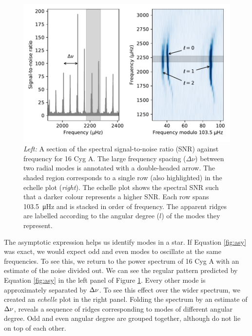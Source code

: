 \begin{figure}[tb]
    \centering
    \includegraphics{figures/seismo-echelle.pdf}
    \caption{\emph{Left:} A section of the spectral signal-to-noise ratio (SNR) against frequency for 16 Cyg A. The large frequency spacing (\(\Delta\nu\)) between two radial modes is annotated with a double-headed arrow. The shaded region corresponds to a single row (also highlighted) in the echelle plot (\emph{right}). The echelle plot shows the spectral SNR such that a darker colour represents a higher SNR. Each row spans \SI{103.5}{\micro\hertz} and is stacked in order of frequency. The apparent ridges are labelled according to the angular degree (\(l\)) of the modes they represent.}
    \label{fig:seismo-echelle}
\end{figure}

The asymptotic expression helps us identify modes in a star. If Equation \ref{fig:asy} was exact, we would expect odd and even modes to oscillate at the same frequencies. To see this, we return to the power spectrum of 16 Cyg A with an estimate of the noise divided out. We can see the regular pattern predicted by Equation \ref{fig:asy} in the left panel of Figure \ref{fig:seismo-echelle}. Every other mode is approximately separated by \(\Delta\nu\). To see this effect over the wider spectrum, we created an \emph{echelle} plot in the right panel. Folding the spectrum by an estimate of \(\Delta\nu\), reveals a sequence of ridges corresponding to modes of different angular degree. Odd and even angular degree are grouped together, although do not lie on top of each other.


